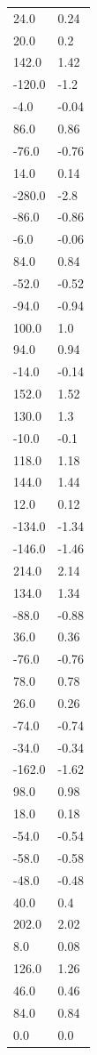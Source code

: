 \begin{longtable}{ll}
24.0 & 0.24 \\
20.0 & 0.2 \\
142.0 & 1.42 \\
-120.0 & -1.2 \\
-4.0 & -0.04 \\
86.0 & 0.86 \\
-76.0 & -0.76 \\
14.0 & 0.14 \\
-280.0 & -2.8 \\
-86.0 & -0.86 \\
-6.0 & -0.06 \\
84.0 & 0.84 \\
-52.0 & -0.52 \\
-94.0 & -0.94 \\
100.0 & 1.0 \\
94.0 & 0.94 \\
-14.0 & -0.14 \\
152.0 & 1.52 \\
130.0 & 1.3 \\
-10.0 & -0.1 \\
118.0 & 1.18 \\
144.0 & 1.44 \\
12.0 & 0.12 \\
-134.0 & -1.34 \\
-146.0 & -1.46 \\
214.0 & 2.14 \\
134.0 & 1.34 \\
-88.0 & -0.88 \\
36.0 & 0.36 \\
-76.0 & -0.76 \\
78.0 & 0.78 \\
26.0 & 0.26 \\
-74.0 & -0.74 \\
-34.0 & -0.34 \\
-162.0 & -1.62 \\
98.0 & 0.98 \\
18.0 & 0.18 \\
-54.0 & -0.54 \\
-58.0 & -0.58 \\
-48.0 & -0.48 \\
40.0 & 0.4 \\
202.0 & 2.02 \\
8.0 & 0.08 \\
126.0 & 1.26 \\
46.0 & 0.46 \\
84.0 & 0.84 \\
0.0 & 0.0 \\

\end{longtable}
